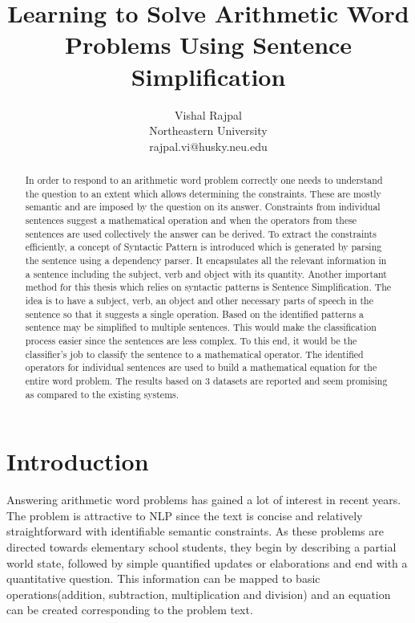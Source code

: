\documentclass[11pt]{article}
\begin{document}
\title{Learning to Solve Arithmetic Word Problems Using Sentence Simplification}
\author{
	Vishal Rajpal\\
	Northeastern University\\
	rajpal.vi@husky.neu.edu\\
}
\date{}
\maketitle

\begin{abstract}
In order to respond to an arithmetic word problem correctly one needs to understand the question to an extent which allows determining the constraints. These are mostly semantic and are imposed by the question on its answer. Constraints from individual sentences suggest a mathematical operation and when the operators from these sentences are used collectively the answer can be derived. To extract the constraints efficiently, a concept of Syntactic Pattern is introduced which is generated by parsing the sentence using a dependency parser. It encapsulates all the relevant information in a sentence including the subject, verb and object with its quantity. Another important method for this thesis which relies on syntactic patterns is Sentence Simplification. The idea is to have a subject, verb, an object and other necessary parts of speech in the sentence so that it suggests a single operation. Based on the identified patterns a sentence may be simplified to multiple sentences. This would make the classification process easier since the sentences are less complex. To this end, it would be the classifier's job to classify the sentence to a mathematical operator. The identified operators for individual sentences are used to build a mathematical equation for the entire word problem. The results based on 3 datasets are reported and seem promising as compared to the existing systems.
\end{abstract}

\section{Introduction}
Answering arithmetic word problems has gained a lot of interest in recent years. The problem is attractive to NLP since the text is concise and relatively straightforward with identifiable semantic constraints. As these problems are directed towards elementary school students, they begin by describing a partial world state, followed by simple quantified updates or elaborations and end with a quantitative question. This information can be mapped to basic operations(addition, subtraction, multiplication and division) and an equation can be created corresponding to the problem text. 
\end{document}
